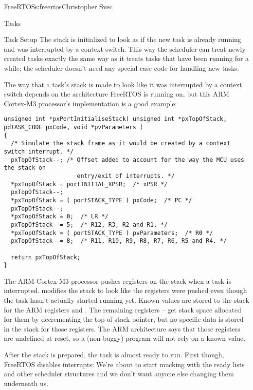 \begin{aosachapter}{FreeRTOS}{s:freertos}{Christopher Svec}
\begin{aosasect1}{Tasks}
\begin{aosasect2}{Task Setup}
The stack is initialized to look as if the new task is already running
and was interrupted by a context switch. This way the scheduler can
treat newly created tasks exactly the same way as it treats tasks that have
been running for a while; the scheduler doesn't need any
special case code for handling new tasks.

The way that a task's stack is made to look like it was interrupted by
a context switch depends on the architecture FreeRTOS is running on,
but this ARM Cortex-M3 processor's implementation is a good example:

\begin{verbatim}
unsigned int *pxPortInitialiseStack( unsigned int *pxTopOfStack, pdTASK_CODE pxCode, void *pvParameters )
{
  /* Simulate the stack frame as it would be created by a context switch interrupt. */
  pxTopOfStack--; /* Offset added to account for the way the MCU uses the stack on 
                     entry/exit of interrupts. */
  *pxTopOfStack = portINITIAL_XPSR;  /* xPSR */
  pxTopOfStack--;
  *pxTopOfStack = ( portSTACK_TYPE ) pxCode;  /* PC */
  pxTopOfStack--;
  *pxTopOfStack = 0;  /* LR */
  pxTopOfStack -= 5;  /* R12, R3, R2 and R1. */
  *pxTopOfStack = ( portSTACK_TYPE ) pvParameters;  /* R0 */
  pxTopOfStack -= 8;  /* R11, R10, R9, R8, R7, R6, R5 and R4. */
  
  return pxTopOfStack;
}
\end{verbatim}

The ARM Cortex-M3 processor pushes registers on the stack when a task
is interrupted. \linebreak {} modifies the stack to
look like the registers were pushed even though the task hasn't
actually started running yet.  Known values are stored to the stack
for the ARM registers  and . The
remaining registers  --  get stack space allocated for them
by decrementing the top of stack pointer, but no specific data is
stored in the stack for those registers. The ARM architecture says
that those registers are undefined at reset, so a (non-buggy) program
will not rely on a known value.

After the stack is prepared, the task is almost ready to run.  First
though, FreeRTOS disables interrupts: We're about to start mucking
with the ready lists and other scheduler structures and we don't want
anyone else changing them underneath us.


\end{aosasect2}
\end{aosasect1}
\end{aosachapter}
